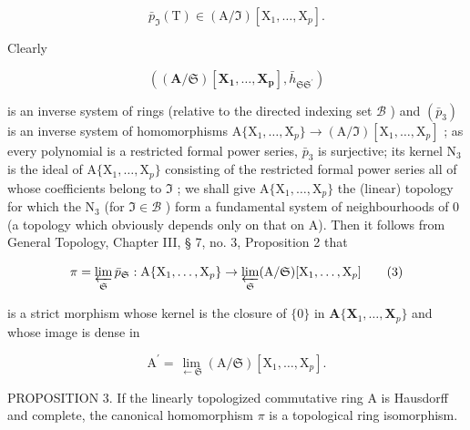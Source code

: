 \[
\bar {p} _ {\Im} (\mathrm{T}) \in (\mathrm{A} / \Im) [ \mathrm{X} _ {1}, \dots , \mathrm{X} _ {p} ].
\]

Clearly

\[
((\mathbf {A} / \mathfrak {S}) [ \mathbf {X _ {1}}, \dots , \mathbf {X _ {p}} ], \bar {h} _ {\mathfrak {S} \mathfrak {S} ^ {\prime}})
\]

is an inverse system of rings (relative to the directed indexing set \(\mathcal{B}\) ) and \((\bar{p}_{3})\) is an inverse system of homomorphisms \(\mathrm{A}\{\mathrm{X}_1,\dots ,\mathrm{X}_p\} \to (\mathrm{A} / \Im)[\mathrm{X}_1,\dots ,\mathrm{X}_p]\) ; as every polynomial is a restricted formal power series, \(\bar{p}_{3}\) is surjective; its kernel \(\mathrm{N}_{3}\) is the ideal of \(\mathrm{A}\{\mathrm{X}_1,\dots ,\mathrm{X}_p\}\) consisting of the restricted formal power series all of whose coefficients belong to \(\Im\) ; we shall give \(\mathrm{A}\{\mathrm{X}_1,\dots ,\mathrm{X}_p\}\) the (linear) topology for which the \(\mathrm{N}_{3}\) (for \(\Im \in \mathcal{B}\) ) form a fundamental system of neighbourhoods of 0 (a topology which obviously depends only on that on A). Then it follows from General Topology, Chapter III, § 7, no. 3, Proposition 2 that

\[
\pi = \varprojlim_ {\mathfrak {S}} \bar {p} _ {\mathfrak {S}}: \mathrm{A} \{\mathrm{X} _ {1}, \dots , \mathrm{X} _ {p} \} \rightarrow \varprojlim_ {\mathfrak {S}} (\mathrm{A} / \mathfrak {S}) [ \mathrm{X} _ {1}, \dots , \mathrm{X} _ {p} ]\tag{3}
\]

is a strict morphism whose kernel is the closure of \(\{0\}\) in \(\mathbf{A}\{\mathbf{X}_1,\ldots ,\mathbf{X}_p\}\) and whose image is dense in

\[
\mathrm{A} ^ {\prime} = \lim _ {\leftarrow \mathfrak {S}} (\mathrm{A} / \mathfrak {S}) [ \mathrm{X} _ {1}, \dots , \mathrm{X} _ {p} ].
\]

PROPOSITION 3. If the linearly topologized commutative ring A is Hausdorff and complete, the canonical homomorphism \(\pi\) is a topological ring isomorphism.

